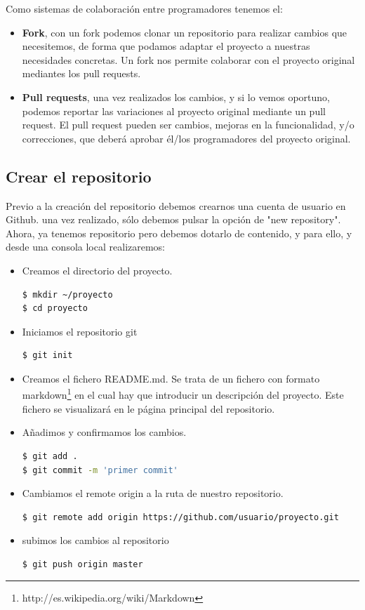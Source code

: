Como sistemas de colaboración entre programadores tenemos el:
\begin{itemize}
\item \textbf{Fork}, con un fork podemos clonar un repositorio para realizar cambios que necesitemos, de forma que podamos adaptar el proyecto a nuestras necesidades concretas. Un fork nos permite colaborar con el proyecto original mediantes los pull requests.
\item \textbf{Pull requests}, una vez realizados los cambios, y si lo vemos oportuno, podemos reportar las variaciones al proyecto original mediante un pull request. El pull request pueden ser cambios, mejoras en la funcionalidad, y/o correcciones, que deberá aprobar él/los programadores del proyecto original. 
\end{itemize}

\subsection{Crear el repositorio}
Previo a la creación del repositorio debemos crearnos una cuenta de usuario en Github. una vez realizado, sólo debemos pulsar la opción de "new repository". Ahora, ya tenemos repositorio pero debemos dotarlo de contenido, y para ello, y desde una consola local realizaremos:

\begin{itemize}
\item Creamos el directorio del proyecto.
\begin{lstlisting}[language=bash, numbers=none]
$ mkdir ~/proyecto
$ cd proyecto
\end{lstlisting}

\item Iniciamos el repositorio git
\begin{lstlisting}[language=bash, numbers=none]
$ git init
\end{lstlisting}

\item Creamos el fichero README.md. Se trata de un fichero con formato markdown\footnote{http://es.wikipedia.org/wiki/Markdown} en el cual hay que introducir un descripción del proyecto. Este fichero se visualizará en le página principal del repositorio. 

\item Añadimos y confirmamos los cambios.
\begin{lstlisting}[language=bash, numbers=none]
$ git add .
$ git commit -m 'primer commit'
\end{lstlisting}

\item Cambiamos el remote origin a la ruta de nuestro repositorio.
\begin{lstlisting}[language=bash, numbers=none]
$ git remote add origin https://github.com/usuario/proyecto.git
\end{lstlisting}

\item subimos los cambios al repositorio
\begin{lstlisting}[language=bash, numbers=none]
$ git push origin master
\end{lstlisting}

\end{itemize}

